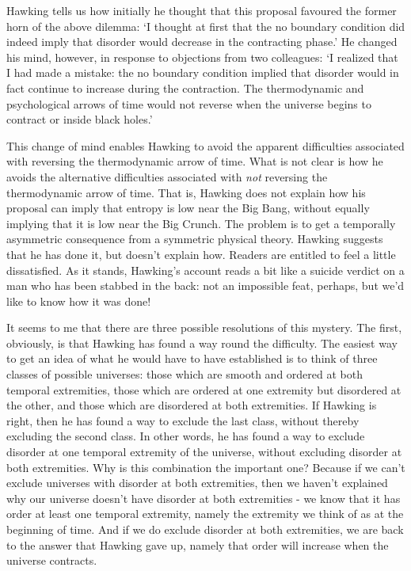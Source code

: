 \documentclass{article}
\begin{document}
Hawking tells us how initially he thought that this proposal favoured
the former horn of the above dilemma: `I thought at first that the no
boundary condition did indeed imply that disorder would decrease in the
contracting phase.' He changed his mind, however, in response to
objections from two colleagues: `I realized that I had made a mistake:
the no boundary condition implied that disorder would in fact continue
to increase during the contraction. The thermodynamic and psychological
arrows of time would not reverse when the universe begins to contract or
inside black holes.'

This change of mind enables Hawking to avoid the apparent difficulties
associated with reversing the thermodynamic arrow of time. What is not
clear is how he avoids the alternative difficulties associated with
\emph{not} reversing the thermodynamic arrow of time. That is, Hawking
does not explain how his proposal can imply that entropy is low near the
Big Bang, without equally implying that it is low near the Big Crunch.
The problem is to get a temporally asymmetric consequence from a
symmetric physical theory. Hawking suggests that he has done it, but
doesn't explain how. Readers are entitled to feel a little dissatisfied.
As it stands, Hawking's account reads a bit like a suicide verdict on a
man who has been stabbed in the back: not an impossible feat, perhaps,
but we'd like to know how it was done!

It seems to me that there are three possible resolutions of this
mystery. The first, obviously, is that Hawking has found a way round the
difficulty. The easiest way to get an idea of what he would have to have
established is to think of three classes of possible universes: those
which are smooth and ordered at both temporal extremities, those which
are ordered at one extremity but disordered at the other, and those
which are disordered at both extremities. If Hawking is right, then he
has found a way to exclude the last class, without thereby excluding the
second class. In other words, he has found a way to exclude disorder at
one temporal extremity of the universe, without excluding disorder at
both extremities. Why is this combination the important one? Because if
we can't exclude universes with disorder at both extremities, then we
haven't explained why our universe doesn't have disorder at both
extremities - we know that it has order at least one temporal extremity,
namely the extremity we think of as at the beginning of time. And if we
do exclude disorder at both extremities, we are back to the answer that
Hawking gave up, namely that order will increase when the universe
contracts.
\end{document}
